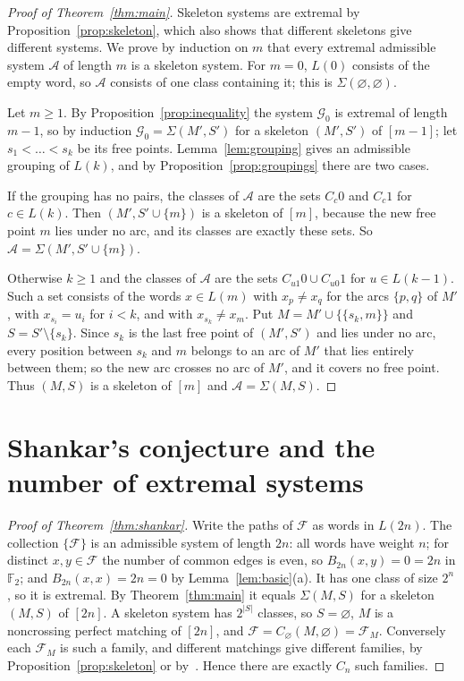 \documentclass[screen]{aomart}
\theoremstyle{definition}
\theoremstyle{remark}
\numberwithin{equation}{section}
\newcommand{\F}{\mathbb{F}}
\newcommand{\cA}{\mathcal{A}}
\newcommand{\cG}{\mathcal{G}}
\begin{document}
\begin{proof}[Proof of Theorem~\ref{thm:main}]
Skeleton systems are extremal by Proposition~\ref{prop:skeleton}, which also shows that different skeletons give different systems. We prove by induction on $m$ that every extremal admissible system $\cA$ of length $m$ is a skeleton system. For $m=0$, $L(0)$ consists of the empty word, so $\cA$ consists of one class containing it; this is $\Sigma(\varnothing,\varnothing)$.

Let $m\ge1$. By Proposition~\ref{prop:inequality} the system $\cG_0$ is extremal of length $m-1$, so by induction $\cG_0=\Sigma(M',S')$ for a skeleton $(M',S')$ of $[m-1]$; let $s_1<\dots<s_k$ be its free points. Lemma~\ref{lem:grouping} gives an admissible grouping of $L(k)$, and by Proposition~\ref{prop:groupings} there are two cases.

If the grouping has no pairs, the classes of $\cA$ are the sets $C_c0$ and $C_c1$ for $c\in L(k)$. Then $(M',S'\cup\{m\})$ is a skeleton of $[m]$, because the new free point $m$ lies under no arc, and its classes are exactly these sets. So $\cA=\Sigma(M',S'\cup\{m\})$.

Otherwise $k\ge1$ and the classes of $\cA$ are the sets $C_{u1}0\cup C_{u0}1$ for $u\in L(k-1)$. Such a set consists of the words $x\in L(m)$ with $x_p\ne x_q$ for the arcs $\{p,q\}$ of $M'$, with $x_{s_i}=u_i$ for $i<k$, and with $x_{s_k}\ne x_m$. Put $M=M'\cup\{\{s_k,m\}\}$ and $S=S'\setminus\{s_k\}$. Since $s_k$ is the last free point of $(M',S')$ and lies under no arc, every position between $s_k$ and $m$ belongs to an arc of $M'$ that lies entirely between them; so the new arc crosses no arc of $M'$, and it covers no free point. Thus $(M,S)$ is a skeleton of $[m]$ and $\cA=\Sigma(M,S)$.
\end{proof}

\section{Shankar's conjecture and the number of extremal systems}\label{sec:final}

\begin{proof}[Proof of Theorem~\ref{thm:shankar}]
Write the paths of $\mathcal F$ as words in $L(2n)$. The collection $\{\mathcal F\}$ is an admissible system of length $2n$: all words have weight $n$; for distinct $x,y\in\mathcal F$ the number of common edges is even, so $B_{2n}(x,y)=0=2n$ in $\F_2$; and $B_{2n}(x,x)=2n=0$ by Lemma~\ref{lem:basic}(a). It has one class of size $2^n$, so it is extremal. By Theorem~\ref{thm:main} it equals $\Sigma(M,S)$ for a skeleton $(M,S)$ of $[2n]$. A skeleton system has $2^{|S|}$ classes, so $S=\varnothing$, $M$ is a noncrossing perfect matching of $[2n]$, and $\mathcal F=C_\varnothing(M,\varnothing)=\mathcal F_M$. Conversely each $\mathcal F_M$ is such a family, and different matchings give different families, by Proposition~\ref{prop:skeleton} or by~\cite[Section~4]{Sh}. Hence there are exactly $C_n$ such families.
\end{proof}
\end{document}
